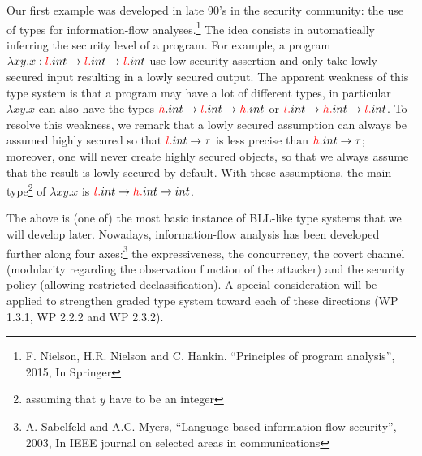 \documentclass{article}[11pt]
\newcommand\rta{\rightarrow}
\begin{document}
Our first example was developed in late 90's in the security community: the use of types for information-flow analyses.\footnote{F. Nielson, H.R. Nielson and C. Hankin. ``Principles of program analysis'', 2015, In Springer} The idea consists in automatically inferring the security level of a program. For example, a program $\lambda xy.x:{\color{red}l.}int\rta {\color{red}l.}int\rta {\color{red}l.}int$ use low security assertion and only take lowly secured input resulting in a lowly secured output. %
The apparent weakness of this type system is that a program may have a lot of different types, in particular $\lambda xy.x$ can also have the types ${\color{red}h}.int\rta {\color{red}l.}int\rta {\color{red}h.}int$ or ${\color{red}l.}int\rta {\color{red}h.}int\rta {\color{red}l.}int$. To resolve this weakness, we remark that a lowly secured assumption can always be assumed highly secured so that ${\color{red}l.}int\rta \tau$ is less precise than ${\color{red}h.}int\rta\tau$; moreover, one will never create highly secured objects, so that we always assume that the result is lowly secured by default. With these assumptions, the main type\footnote{assuming that $y$ have to be an integer} of $\lambda xy.x$ is ${\color{red}l.}int\rta {\color{red}h.}int\rta int$.

The above is (one of) the most basic instance of BLL-like type systems that we will develop later. Nowadays, information-flow analysis has been developed further along four axes:\footnote{A. Sabelfeld and A.C. Myers, ``Language-based information-flow security'', 2003, In IEEE journal on selected areas in communications} the expressiveness, the concurrency, the covert channel (modularity regarding the observation function of the attacker) and the security policy (allowing restricted declassification). A special consideration will be applied to strengthen graded type system toward each of these directions (WP 1.3.1, WP 2.2.2 and WP 2.3.2).

\end{document}

